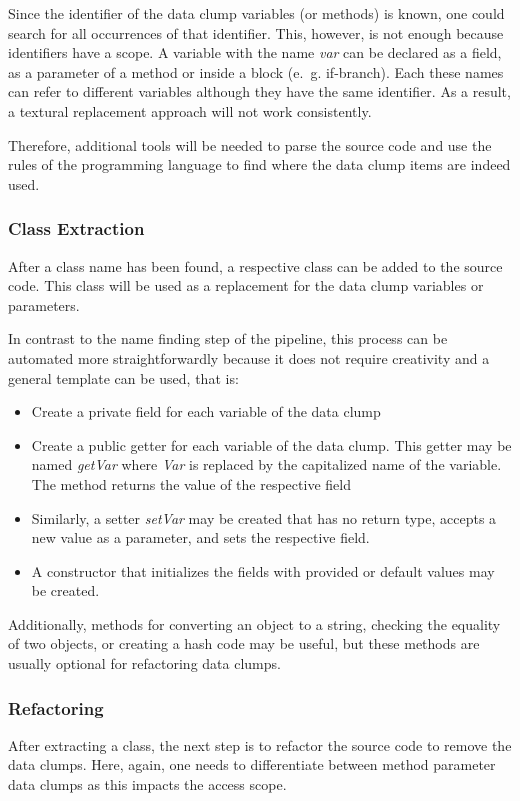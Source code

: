 Since the identifier of the data clump variables (or methods) is known, one could search for all occurrences of that identifier. This, however, is not enough because identifiers have a scope. A variable with the name \textit{var} can be declared as a field, as a parameter of a method or inside a block (e.~g. if-branch). Each these names can refer to different variables although they have the same identifier. As a result, a textural replacement approach will not work consistently.

Therefore, additional tools will be needed to parse the source code and use the rules of the programming language to find where the data clump items are indeed used.
\subsubsection{Class Extraction}\label{subsec:chap3_data_class_extraction}
After a class name has been found, a respective class can be added to the source code. This class will be used as a replacement for the data clump variables or parameters. 

In contrast to the name finding step of the pipeline, this process can be automated more straightforwardly because it does not require creativity and a general template can be used, that is:
\begin{itemize}
    \item Create a private field for each variable of the data clump
    \item Create a public getter for each variable of the data clump. This getter may be named \textit{getVar} where \textit{Var} is replaced by the capitalized name of the variable. The method returns the value of the respective field
    \item Similarly, a setter \textit{setVar} may be created that has no return type, accepts a new value as a parameter, and sets the respective field. 
    \item A constructor that initializes the fields with provided or default values may be created. 
\end{itemize}

Additionally, methods for converting an object to a string, checking the equality of two objects, or creating a hash code may be useful, but these methods are usually optional for refactoring data clumps. 


\subsubsection{Refactoring}
After extracting a class, the next step is to refactor the source code to remove the data clumps. Here, again, one needs to differentiate between method parameter data clumps as this impacts the access scope. 

